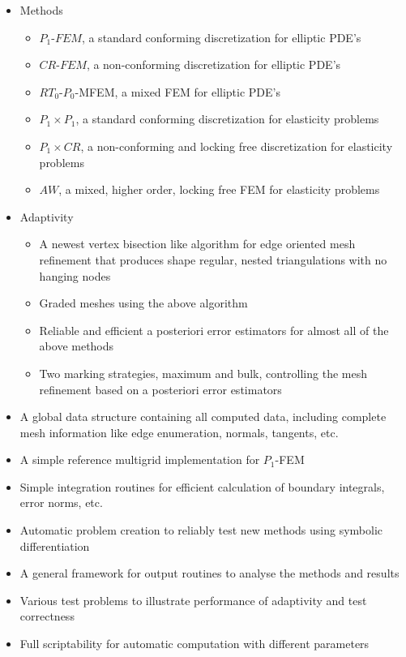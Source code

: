 \begin{itemize}
    \item{Methods}
        \begin{itemize}
            \item{$P_1$-$FEM$, a standard conforming discretization for elliptic PDE's}
            \item{$CR$-$FEM$, a non-conforming discretization for elliptic PDE's}
            \item{$RT_0$-$P_0$-MFEM, a mixed FEM for elliptic PDE's}
            \item{$P_1\times P_1$, a standard conforming discretization for elasticity problems}
            \item{$P_1\times CR$, a non-conforming and locking free discretization for elasticity problems}
            \item{$AW$, a mixed, higher order, locking free FEM for elasticity problems}
        \end{itemize}
    \item{Adaptivity}
        \begin{itemize}
            \item{A newest vertex bisection like algorithm for edge oriented mesh refinement that produces shape regular, nested triangulations with no hanging nodes}
            \item{Graded meshes using the above algorithm}
            \item{Reliable and efficient a posteriori error estimators for almost all of the above methods}
            \item{Two marking strategies, maximum and bulk, controlling the mesh refinement based on a posteriori error estimators}
        \end{itemize}
    \item{A global data structure containing all computed data, including complete mesh information like edge enumeration, normals, tangents, etc.}
    \item{A simple reference multigrid implementation for $P_1$-FEM}
    \item{Simple integration routines for efficient calculation of boundary integrals, error norms, etc.}
    \item{Automatic problem creation to reliably test new methods using symbolic differentiation}
    \item{A general framework for output routines to analyse the methods and results}
    \item{Various test problems to illustrate performance of adaptivity and test correctness}
    \item{Full scriptability for automatic computation with different parameters}
\end{itemize}
